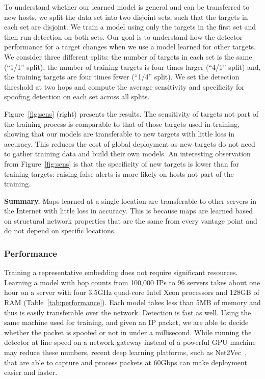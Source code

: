 To understand whether our learned model is general and can be transferred to new hosts, we split the data set into two disjoint sets, such that the targets in each set are disjoint. We train a model using only the targets in the first set and then run detection on both sets. Our goal is to understand how the detector performance for a target changes when we use a model learned for other targets. We consider three different splits: the number of targets in each set is the same (``1/1'' split), the number of training targets is four times larger (``4/1'' split) and, the training targets are four times fewer (``1/4'' split). We set the detection threshold at two hops and compute the average sensitivity and specificity for spoofing detection on each set across all splits. 

Figure~\ref{fig:sens} (right) presents the results. The sensitivity of targets not part of the training process is comparable to that of those targets used in training, showing that our models are transferable to new targets with little loss in accuracy. This reduces the cost of global deployment as new targets do not need to gather training data and build their own models. An interesting observation from Figure~\ref{fig:sens} is that the specificity of new targets is lower than for training targets: raising false alerts is more likely on hosts not part of the training.

{\bf Summary.} Maps learned at a single location are transferable to other servers in the Internet with little loss in accuracy. This is because maps are learned based on structural network properties that are the same from every vantage point and do not depend on specific locations. 


\subsubsection{Performance}

Training a representative embedding does not require significant resources. Learning a model with hop counts from 100,000 IPs to 96 servers takes about one hour on a server with four 3.5GHz quad-core Intel Xeon processors and 128GB of RAM (Table~\ref{tab:performance}). Each model takes less than 5MB of memory and thus is easily transferable over the network. Detection is fast as well. Using the same machine used for training, and given an IP packet, we are able to decide whether the packet is spoofed or not in under a millisecond. While running the detector at line speed on a network gateway instead of a powerful GPU machine may reduce these numbers, recent deep learning platforms, such as Net2Vec~\citep{net2vec}, that are able to capture and process packets at 60Gbps can make deployment easier and faster.

